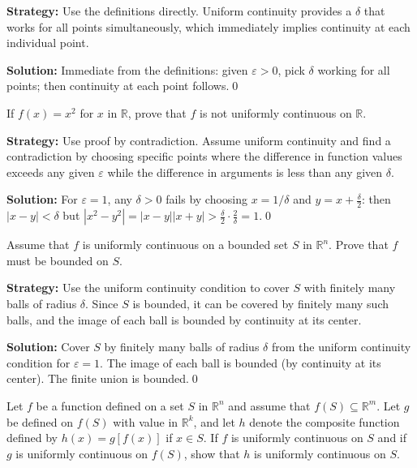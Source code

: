 \noindent\textbf{Strategy:} Use the definitions directly. Uniform continuity provides a $\delta$ that works for all points simultaneously, which immediately implies continuity at each individual point.

\bigskip\noindent\textbf{Solution:}
Immediate from the definitions: given $\varepsilon>0$, pick $\delta$ working for all points; then continuity at each point follows.\qed



\begin{problembox}
If $f(x) = x^2$ for $x$ in $\mathbb{R}$, prove that $f$ is not uniformly continuous on $\mathbb{R}$.
\end{problembox}

\noindent\textbf{Strategy:} Use proof by contradiction. Assume uniform continuity and find a contradiction by choosing specific points where the difference in function values exceeds any given $\varepsilon$ while the difference in arguments is less than any given $\delta$.

\bigskip\noindent\textbf{Solution:}
For $\varepsilon=1$, any $\delta>0$ fails by choosing $x=1/\delta$ and $y=x+\tfrac{\delta}{2}$: then $|x-y|<\delta$ but $|x^2-y^2|=|x-y||x+y|>\tfrac{\delta}{2}\cdot\tfrac{2}{\delta}=1$.\qed



\begin{problembox}
Assume that $f$ is uniformly continuous on a bounded set $S$ in $\mathbb{R}^n$. Prove that $f$ must be bounded on $S$.
\end{problembox}

\noindent\textbf{Strategy:} Use the uniform continuity condition to cover $S$ with finitely many balls of radius $\delta$. Since $S$ is bounded, it can be covered by finitely many such balls, and the image of each ball is bounded by continuity at its center.

\bigskip\noindent\textbf{Solution:}
Cover $S$ by finitely many balls of radius $\delta$ from the uniform continuity condition for $\varepsilon=1$. The image of each ball is bounded (by continuity at its center). The finite union is bounded.\qed



\begin{problembox}
Let $f$ be a function defined on a set $S$ in $\mathbb{R}^n$ and assume that $f(S) \subseteq \mathbb{R}^m$. Let $g$ be defined on $f(S)$ with value in $\mathbb{R}^k$, and let $h$ denote the composite function defined by $h(x) = g[f(x)]$ if $x \in S$. If $f$ is uniformly continuous on $S$ and if $g$ is uniformly continuous on $f(S)$, show that $h$ is uniformly continuous on $S$.
\end{problembox}

